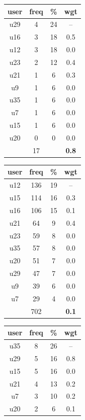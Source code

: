 \begin{table}
\centering
\begin{tabular}{ |c|c|c|c| }
	\hline
	\textbf{user} & \textbf{freq} & \textbf{\%} & \textbf{wgt} \\
	\hline
	u29 & 4 & 24 & -- \\
	u16 & 3 & 18 & 0.5 \\
	u12 & 3 & 18 & 0.0 \\
	u23 & 2 & 12 & 0.4 \\
	u21 & 1 & 6 & 0.3 \\
	u9 & 1 & 6 & 0.0 \\
	u35 & 1 & 6 & 0.0 \\
	u7 & 1 & 6 & 0.0 \\
	u15 & 1 & 6 & 0.0 \\
	u20 & 0 & 0 & 0.0 \\
	 & 17 & & \textbf{0.8} \\
	\hline
\end{tabular}
\begin{tabular}{ |c|c|c|c| }
	\hline
	\textbf{user} & \textbf{freq} & \textbf{\%} & \textbf{wgt} \\
	\hline
	u12 & 136 & 19 & -- \\
	u15 & 114 & 16 & 0.3 \\
	u16 & 106 & 15 & 0.1 \\
	u21 & 64 & 9 & 0.4 \\
	u23 & 59 & 8 & 0.0 \\
	u35 & 57 & 8 & 0.0 \\
	u20 & 51 & 7 & 0.0 \\
	u29 & 47 & 7 & 0.0 \\
	u9 & 39 & 6 & 0.0 \\
	u7 & 29 & 4 & 0.0 \\
	 & 702 & & \textbf{0.1} \\
	\hline
\end{tabular}
\begin{tabular}{ |c|c|c|c| }
	\hline
	\textbf{user} & \textbf{freq} & \textbf{\%} & \textbf{wgt} \\
	\hline
	u35 & 8 & 26 & -- \\
	u29 & 5 & 16 & 0.8 \\
	u15 & 5 & 16 & 0.0 \\
	u21 & 4 & 13 & 0.2 \\
	u7 & 3 & 10 & 0.2 \\
	u20 & 2 & 6 & 0.1 \\

\end{tabular}
\end{table}
